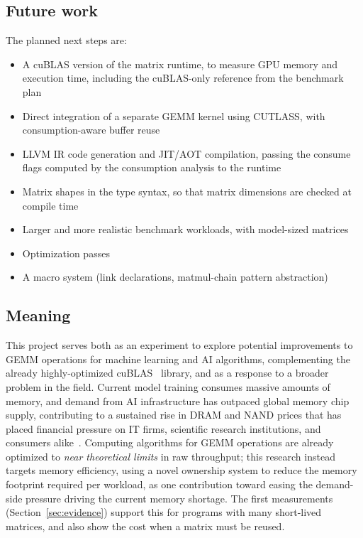 \documentclass[a4paper]{article}
\begin{document}
	\subsection{Future work}
	The planned next steps are:
	\begin{itemize}
		\item A cuBLAS version of the matrix runtime, to measure GPU memory and execution time, including the cuBLAS-only reference from the benchmark plan
		\item Direct integration of a separate GEMM kernel using CUTLASS, with consumption-aware buffer reuse
		\item LLVM IR code generation and JIT/AOT compilation, passing the consume flags computed by the consumption analysis to the runtime
		\item Matrix shapes in the type syntax, so that matrix dimensions are checked at compile time
		\item Larger and more realistic benchmark workloads, with model-sized matrices
		\item Optimization passes
		\item A macro system (link declarations, matmul-chain pattern abstraction)
\end{itemize}

	\subsection{Meaning}
		This project serves both as an experiment to explore potential improvements to GEMM operations for
		machine learning and AI algorithms, complementing the already highly-optimized cuBLAS~\cite{cublas} library, and
		as a response to a broader problem in the field. Current model training consumes massive amounts of
		memory, and demand from AI infrastructure has outpaced global memory chip supply, contributing to a
		sustained rise in DRAM and NAND prices that has placed financial pressure on IT firms, scientific
		research institutions, and consumers alike~\cite{DRAM_PRICE}. 
		 Computing algorithms for GEMM operations are already
		optimized to \emph{near theoretical limits} in raw throughput; this research instead targets memory
		efficiency, using a novel ownership system to reduce the memory footprint required per workload,
		as one contribution toward easing the demand-side pressure driving the current memory shortage.
		The first measurements (Section~\ref{sec:evidence}) support this for programs with many short-lived matrices, and also show the cost when a matrix must be reused.
		
\end{document}
